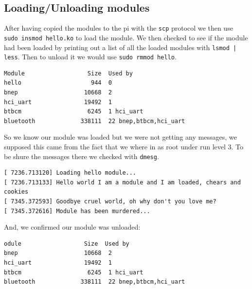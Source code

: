\documentclass[a4paper,oneside,onecolumn]{article}
\newcommand{\code}[1]{\colorbox{codegray}{\texttt{#1}}}
\begin{document}
\subsection{Loading/Unloading modules}
After having copied the modules to the pi with the \code{scp} protocol we then use \code{sudo insmod hello.ko} to load the module. We then checked to see if the module had been loaded by printing out a list of all the loaded modules with \code{lsmod | less}. Then to unload it we would use \code{sudo rmmod hello}.
\begin{lstlisting}
Module                  Size  Used by
hello                    944  0 
bnep                   10668  2 
hci_uart               19492  1 
btbcm                   6245  1 hci_uart
bluetooth             338111  22 bnep,btbcm,hci_uart
\end{lstlisting}
So we know our module was loaded but we were not getting any messages, we supposed this came from the fact that we where in as root under run level 3. To be shure the messages there we checked with \code{dmesg}.
\begin{lstlisting}
[ 7236.713120] Loading hello module...
[ 7236.713133] Hello world I am a module and I am loaded, chears and cookies 
[ 7345.372593] Goodbye cruel world, oh why don't you love me?
[ 7345.372616] Module has been murdered...
\end{lstlisting}
And, we confirmed our module was unloaded:
\begin{lstlisting}
odule                  Size  Used by
bnep                   10668  2 
hci_uart               19492  1 
btbcm                   6245  1 hci_uart
bluetooth             338111  22 bnep,btbcm,hci_uart
\end{lstlisting}
\end{document}
